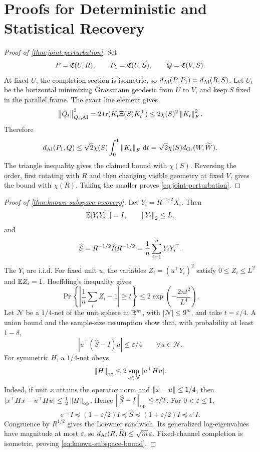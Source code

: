 \section{Proofs for Deterministic and Statistical Recovery}
\label{app:recovery-proofs}

\begin{proof}[Proof of \cref{thm:joint-perturbation}]
Set
\[
  P=\mathfrak C(U,R),
  \qquad
  P_1=\mathfrak C(U,S),
  \qquad
  Q=\mathfrak C(V,S).
\]
At fixed \(U\), the completion section is isometric, so
\(d_{\mathrm{AI}}(P,P_1)=d_{\mathrm{AI}}(R,S)\).  Let \(U_t\) be the horizontal minimizing
Grassmann geodesic from \(U\) to \(V\), and keep \(S\) fixed in the parallel
frame.  The exact line element gives
\[
  \left\lVert \dot Q_t\right\rVert_{Q_t,\mathrm{AI}}^2
  =2\operatorname{tr}(K_t\Xi(S)K_t^\top)
  \le2\chi(S)^2\left\lVert K_t\right\rVert_F^2.
\]
Therefore
\[
  d_{\mathrm{AI}}(P_1,Q)
  \le\sqrt2\chi(S)\int_0^1\left\lVert K_t\right\rVert_F\,\mathrm d t
  =\sqrt2\chi(S)d_{\mathrm{Gr}}(W,\widetilde W).
\]
The triangle inequality gives the claimed bound with \(\chi(S)\).  Reversing
the order, first rotating with \(R\) and then changing visible geometry at
fixed \(V\), gives the bound with \(\chi(R)\).  Taking the smaller proves
\eqref{eq:joint-perturbation}.
\end{proof}

\begin{proof}[Proof of \cref{thm:known-subspace-recovery}]
Let \(Y_i=R^{-1/2}X_i\).  Then
\[
  \mathbb E[Y_iY_i^\top]=I,
  \qquad
  \left\lVert Y_i\right\rVert_2\le L,
\]
and
\[
  \widehat S=R^{-1/2}\widehat R R^{-1/2}
  =\frac1n\sum_{i=1}^nY_iY_i^\top.
\]
The \(Y_i\) are i.i.d.  For fixed unit \(u\), the variables
\(Z_i=(u^\top Y_i)^2\) satisfy \(0\le Z_i\le L^2\) and
\(\mathbb E Z_i=1\).  Hoeffding's inequality gives
\[
  \Pr\left\{
  \left|\frac1n\sum_iZ_i-1\right|\ge t
  \right\}
  \le2\exp\left(-\frac{2nt^2}{L^4}\right).
\]
Let \(\mathcal N\) be a \(1/4\)-net of the unit sphere in \(\mathbb R^m\), with
\(|\mathcal N|\le9^m\), and take \(t=\varepsilon/4\).  A union bound and the
sample-size assumption show that, with probability at least \(1-\delta\),
\[
  |u^\top(\widehat S-I)u|\le\varepsilon/4
  \qquad\forall u\in\mathcal N.
\]
For symmetric \(H\), a \(1/4\)-net obeys
\[
  \left\lVert H\right\rVert_{\operatorname{op}}\le2\sup_{u\in\mathcal N}|u^\top Hu|.
\]
Indeed, if unit \(x\) attains the operator norm and
\(\left\lVert x-u\right\rVert\le1/4\), then
\(|x^\top Hx-u^\top Hu|\le\frac12\left\lVert H\right\rVert_{\operatorname{op}}\).  Hence
\(\left\lVert \widehat S-I\right\rVert_{\operatorname{op}}\le\varepsilon/2\).  For
\(0<\varepsilon\le1\),
\[
  e^{-\varepsilon}I
  \preceq(1-\varepsilon/2)I
  \preceq\widehat S
  \preceq(1+\varepsilon/2)I
  \preceq e^\varepsilon I.
\]
Congruence by \(R^{1/2}\) gives the Loewner sandwich.  Its generalized
log-eigenvalues have magnitude at most \(\varepsilon\), so
\(d_{\mathrm{AI}}(R,\widehat R)\le\sqrt m\,\varepsilon\).  Fixed-channel completion is
isometric, proving \eqref{eq:known-subspace-bound}.
\end{proof}

